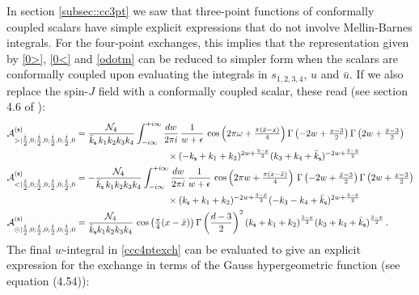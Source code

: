 \documentclass[11pt,a4paper]{article}
\begin{document}
In section \ref{subsec::cc3pt} we saw that three-point functions of conformally coupled scalars have simple explicit expressions that do not involve Mellin-Barnes integrals. For the four-point exchanges, this implies that the representation given by \eqref{0>}, \eqref{0<} and \eqref{odotm} can be reduced to simpler form when the scalars are conformally coupled upon evaluating the integrals in $s_{1,2,3,4}$, $u$ and ${\bar u}$. If we also replace the spin-$J$ field with a conformally coupled scalar, these read (see section 4.6 of \cite{Sleight:2019hfp}): 
\begin{subequations}\label{ccc4ptexch}
\begin{align}
    \mathcal{A}^{({\sf  s})}_{>|\tfrac{i}{2},0;\tfrac{i}{2},0;\tfrac{i}{2},0;\tfrac{i}{2},0}&=\frac{{\cal N}_4}{{\bar k}_{\sf s}\,k_1 k_2 k_3 k_4}\int^{+i\infty}_{-i\infty} \frac{dw}{2\pi i}\,\frac1{w+\epsilon}\,\cos \left(2\pi\omega+\tfrac{\pi (\bar{x}-x)}{4} \right)\Gamma \left(-2 w+\tfrac{x-3}{2}\right) \Gamma \left(2 w+\tfrac{\bar{x}-3}{2}\right)\\\nonumber&\hspace{100pt}\times (-k_{\sf s}+k_1+k_2)^{2 w+\frac{3-x}{2}} (k_3+k_4+\bar{k}_{\sf s})^{-2 w+\frac{3-\bar{x}}{2}}\\
    \mathcal{A}^{({\sf  s})}_{<|\tfrac{i}{2},0;\tfrac{i}{2},0;\tfrac{i}{2},0;\tfrac{i}{2},0}&=-\frac{{\cal N}_4}{{\bar k}_{\sf s}\,k_1 k_2 k_3 k_4}\int^{+i\infty}_{-i\infty} \frac{dw}{2\pi i}\,\frac1{w+\epsilon}\,\cos \left(2\pi w+\tfrac{\pi (x-\bar{x})}{4}\right)\,\Gamma \left(-2 w+\tfrac{\bar{x}-3}{2}\right) \Gamma \left(2 w+\tfrac{x-3}{2}\right)\nonumber\\&\hspace{100pt}\times (k_{\sf s}+k_1+k_2)^{-2 w+\frac{3-\bar{x}}{2}} (-k_3-k_4+\bar{k}_{\sf s})^{2 w+\frac{3-\bar{x}}{2}}\\
    \mathcal{A}^{({\sf  s})}_{\odot|\tfrac{i}{2},0;\tfrac{i}{2},0;\tfrac{i}{2},0;\tfrac{i}{2},0}&=\frac{{\cal N}_4}{{\bar k}_{\sf s} k_1 k_2 k_3 k_4}\,\cos\left(\tfrac{\pi}4(x-\bar{x})\right)\Gamma \left(\frac{d-3}{2}\right)^2 (k_{\sf s}+k_1+k_2)^{\frac{3-x}{2}} (k_3+k_4+\bar{k}_{\sf s})^{\frac{3-\bar{x}}{2}}\,.
\end{align}
\end{subequations}
The final $w$-integral in \eqref{ccc4ptexch} can be evaluated to give an explicit expression for the exchange in terms of the Gauss hypergeometric function (see \cite{Sleight:2019mgd} equation (4.54)):
\end{document}
